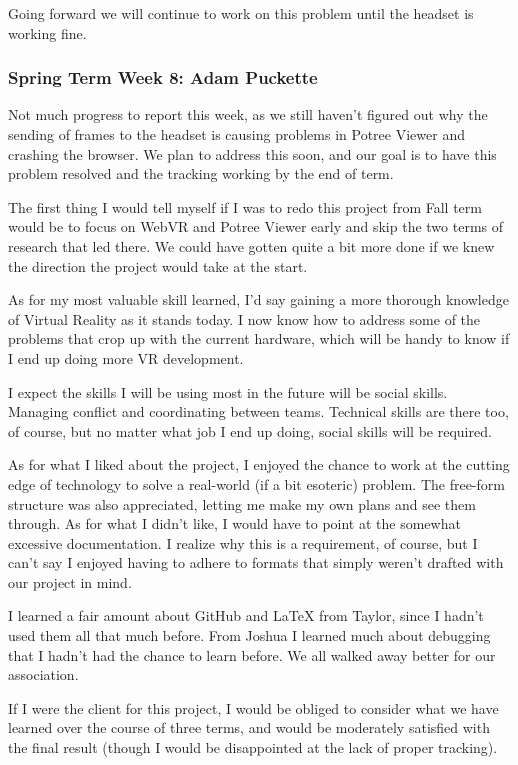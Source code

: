 \documentclass[draftclsnofoot,onecolumn]{IEEEtran}
\begin{document}
Going forward we will continue to work on this problem until the headset is working fine.

\subsubsection{Spring Term Week 8: Adam Puckette}

Not much progress to report this week, as we still haven't figured out why the sending of frames to the headset is causing problems in Potree Viewer and crashing the browser. We plan to address this soon, and our goal is to have this problem resolved and the tracking working by the end of term.

The first thing I would tell myself if I was to redo this project from Fall term would be to focus on WebVR and Potree Viewer early and skip the two terms of research that led there. We could have gotten quite a bit more done if we knew the direction the project would take at the start.

As for my most valuable skill learned, I'd say gaining a more thorough knowledge of Virtual Reality as it stands today. I now know how to address some of the problems that crop up with the current hardware, which will be handy to know if I end up doing more VR development.

I expect the skills I will be using most in the future will be social skills. Managing conflict and coordinating between teams. Technical skills are there too, of course, but no matter what job I end up doing, social skills will be required.

As for what I liked about the project, I enjoyed the chance to work at the cutting edge of technology to solve a real-world (if a bit esoteric) problem. The free-form structure was also appreciated, letting me make my own plans and see them through. As for what I didn't like, I would have to point at the somewhat excessive documentation. I realize why this is a requirement, of course, but I can't say I enjoyed having to adhere to formats that simply weren't drafted with our project in mind.

I learned a fair amount about GitHub and LaTeX from Taylor, since I hadn't used them all that much before. From Joshua I learned much about debugging that I hadn't had the chance to learn before. We all walked away better for our association.

If I were the client for this project, I would be obliged to consider what we have learned over the course of three terms, and would be moderately satisfied with the final result (though I would be disappointed at the lack of proper tracking).
\end{document}
